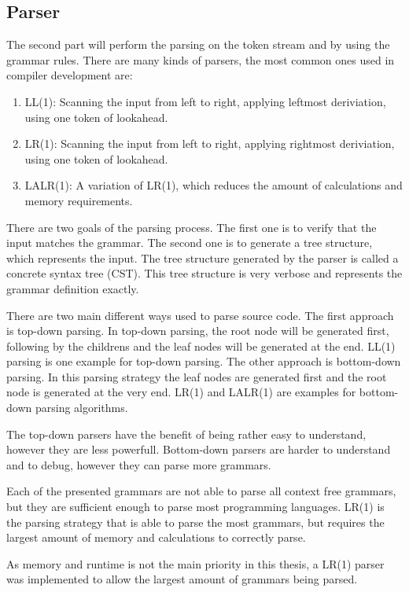 
\subsection{Parser}

The second part will perform the parsing on the token stream and by using the grammar rules. There are many kinds of parsers, the most common ones used in compiler development are:

\begin{enumerate}
\item LL(1): Scanning the input from left to right, applying leftmost deriviation, using one token of lookahead.
\item LR(1): Scanning the input from left to right, applying rightmost deriviation, using one token of lookahead.
\item LALR(1): A variation of LR(1), which reduces the amount of calculations and memory requirements.
\end{enumerate}

There are two goals of the parsing process. The first one is to verify that the input matches the grammar. The second one is to generate a tree structure, which represents the input. The tree structure generated by the parser is called a concrete syntax tree (CST). This tree structure is very verbose and represents the grammar definition exactly.

There are two main different ways used to parse source code. The first approach is top-down parsing. In top-down parsing, the root node will be generated first, following by the childrens and the leaf nodes will be generated at the end. LL(1) parsing is one example for top-down parsing. The other approach is bottom-down parsing. In this parsing strategy the leaf nodes are generated first and the root node is generated at the very end. LR(1) and LALR(1) are examples for bottom-down parsing algorithms.

The top-down parsers have the benefit of being rather easy to understand, however they are less powerfull. Bottom-down parsers are harder to understand and to debug, however they can parse more grammars.

Each of the presented grammars are not able to parse all context free grammars, but they are sufficient enough to parse most programming languages. LR(1) is the parsing strategy that is able to parse the most grammars, but requires the largest amount of memory and calculations to correctly parse.

As memory and runtime is not the main priority in this thesis, a LR(1) parser was implemented to allow the largest amount of grammars being parsed.

